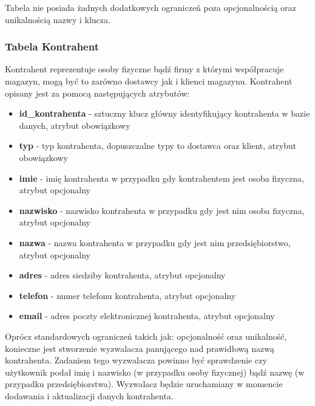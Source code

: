 Tabela nie posiada żadnych dodatkowych ograniczeń poza opcjonalnością oraz
unikalnością nazwy i klucza.

\subsubsection{Tabela Kontrahent}
Kontrahent reprezentuje osoby fizyczne bądź firmy z którymi współpracuje
magazyn, mogą być to zarówno dostawcy jak i klienci magazynu. Kontrahent opisany
jest za pomocą następujących atrybutów:
\begin{itemize}
  \item \textbf{id\_kontrahenta} - sztuczny klucz główny identyfikujący
  kontrahenta w bazie danych, atrybut obowiązkowy
  \item \textbf{typ} - typ kontrahenta, dopuszczalne typy to dostawca oraz
  klient, atrybut obowiązkowy
  \item \textbf{imie} - imię kontrahenta w przypadku gdy kontrahentem jest osoba
  fizyczna, atrybut opcjonalny
  \item \textbf{nazwisko} - nazwisko kontrahenta w przypadku gdy jest nim osoba
  fizyczna, atrybut opcjonalny
  \item \textbf{nazwa} - nazwa kontrahenta w przypadku gdy jest nim
  przedsiębiorstwo, atrybut opcjonalny 
  \item \textbf{adres} - adres siedziby kontrahenta, atrybut opcjonalny
  \item \textbf{telefon} - numer telefonu kontrahenta, atrybut opcjonalny
  \item \textbf{email} - adres poczty elektronicznej kontrahenta, atrybut
  opcjonalny
\end{itemize}

Oprócz standardowych ograniczeń takich jak: opcjonalność oraz unikalność,
konieczne jest stworzenie wyzwalacza panującego nad prawidłową nazwą
kontrahenta. Zadaniem tego wyzwalacza powinno być sprawdzenie czy użytkownik
podał imię i nazwisko (w przypadku osoby fizycznej) bądź nazwę (w przypadku
przedsiębiorstwa). Wyzwalacz będzie uruchamiany w momencie dodawania i aktualizacji danych kontrahenta.

